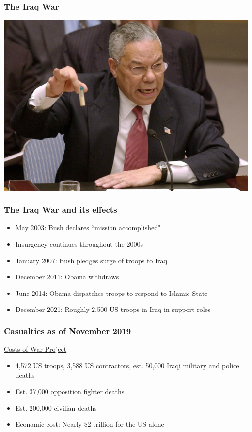 \documentclass[handout]{beamer}
\begin{document}
\begin{frame} 
	\frametitle{\LARGE{The Iraq War}}
	\centering
	\includegraphics[width=\textwidth,height=0.8\textheight,keepaspectratio]{Powell.jpg}
\end{frame}


\begin{frame} 
	\frametitle{\LARGE{The Iraq War and its effects}}
	\begin{itemize}
		\item May 2003: Bush declares ``mission accomplished"
		\item Insurgency continues throughout the 2000s
		\item January 2007: Bush pledges surge of troops to Iraq
		\item December 2011: Obama withdraws
		\item June 2014: Obama dispatches troops to respond to Islamic State 
		\item December 2021: Roughly 2,500 US troops in Iraq in support roles
	\end{itemize}
\end{frame}

\begin{frame} 
	\frametitle{\LARGE{Casualties as of November 2019}}
	\href{https://watson.brown.edu/costsofwar/}{Costs of War Project}
	\begin{itemize}
		\item 4,572 US troops, 3,588 US contractors, est. 50,000 Iraqi military and police deaths
		\item Est. 37,000 opposition fighter deaths
		\item Est. 200,000 civilian deaths
		\item Economic cost: Nearly \$2 trillion for the US alone
	\end{itemize}
\end{frame}
\end{document}

